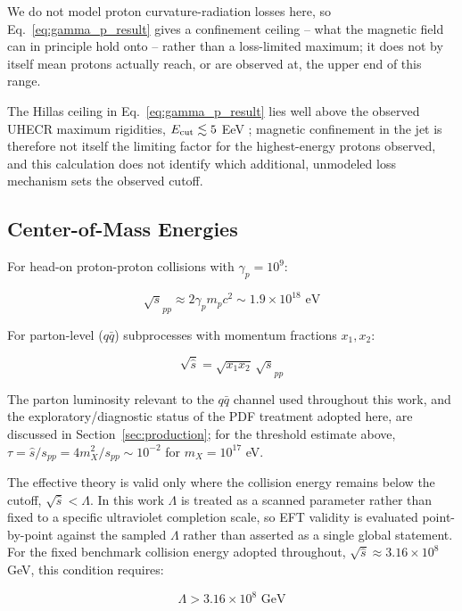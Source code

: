 \documentclass[twocolumn,superscriptaddress,prd,nofootinbib]{revtex4-2}
\begin{document}
\noindent We do not model proton curvature-radiation losses here, so Eq.~\ref{eq:gamma_p_result} gives a confinement ceiling -- what the magnetic field can in principle hold onto -- rather than a loss-limited maximum; it does not by itself mean protons actually reach, or are observed at, the upper end of this range.

The Hillas ceiling in Eq.~\ref{eq:gamma_p_result} lies well above the observed UHECR maximum rigidities, $E_{\rm cut} \lesssim 5$ EeV \citep{Auger2020}; magnetic confinement in the jet is therefore not itself the limiting factor for the highest-energy protons observed, and this calculation does not identify which additional, unmodeled loss mechanism sets the observed cutoff.

\subsection{Center-of-Mass Energies}

For head-on proton-proton collisions with $\gamma_p = 10^9$:

\begin{equation}
\sqrt{s}_{pp} \approx 2\gamma_p m_p c^2 \sim 1.9 \times 10^{18} \text{ eV}
\label{eq:sqrt_s_pp}
\end{equation}

For parton-level ($q\bar{q}$) subprocesses with momentum fractions $x_1, x_2$:

\begin{equation}
\sqrt{\hat{s}} = \sqrt{x_1 x_2}\,\sqrt{s}_{pp}
\label{eq:sqrt_s_hat}
\end{equation}

The parton luminosity relevant to the $q\bar{q}$ channel used throughout this work, and the exploratory/diagnostic status of the PDF treatment adopted here, are discussed in Section~\ref{sec:production}; for the threshold estimate above, $\tau = \hat{s}/s_{pp} = 4m_X^2/s_{pp} \sim 10^{-2}$ for $m_X = 10^{17}$ eV.

The effective theory is valid only where the collision energy remains below the cutoff, $\sqrt{\hat{s}} < \Lambda$. In this work $\Lambda$ is treated as a scanned parameter rather than fixed to a specific ultraviolet completion scale, so EFT validity is evaluated point-by-point against the sampled $\Lambda$ rather than asserted as a single global statement. For the fixed benchmark collision energy adopted throughout, $\sqrt{\hat{s}} \approx 3.16\times10^8$ GeV, this condition requires:

\begin{equation}
\Lambda > 3.16\times10^{8}\text{ GeV}
\label{eq:EFT_cutoff}
\end{equation}
\end{document}
